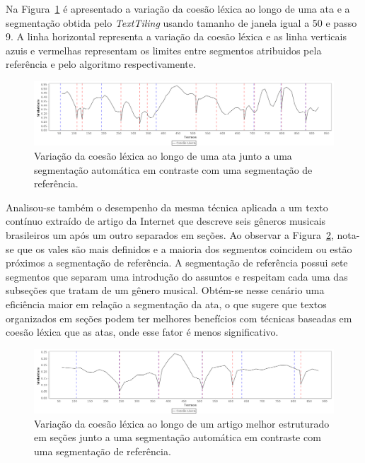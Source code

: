 Na Figura~\ref{fig:coesaolexicaTT} é apresentado a variação da coesão léxica ao longo de uma ata e a segmentação obtida pelo \textit{TextTiling} usando tamanho de janela igual a 50 e passo 9. A linha horizontal representa a variação da coesão léxica e as linha verticais azuis e vermelhas representam os limites entre segmentos atribuidos pela referência e pelo algoritmo respectivamente. 





  \begin{figure}[!h]
	  \centering
	  \includegraphics[width=\textwidth]{conteudo/capitulos/figs/coesaolexicaTT-50-9.png}
	  \caption{Variação da coesão léxica ao longo de uma ata junto a uma segmentação automática em contraste com uma segmentação de referência.}
	  \label{fig:coesaolexicaTT}
  \end{figure}


Analisou-se também o desempenho da mesma técnica aplicada a um texto contínuo extraído de artigo da Internet que descreve seis gêneros musicais brasileiros um após um outro separados em seções. Ao observar a Figura~\ref{fig:coesaolexicaTT-generos-musicais}, nota-se que os vales são mais definidos e a maioria dos segmentos coincidem ou estão próximos a segmentação de referência. A segmentação de referência possui sete segmentos que separam uma introdução do assuntos e respeitam cada uma das subseções que tratam de um gênero musical. Obtém-se nesse cenário uma eficiência maior em relação a segmentação da ata, o que sugere que textos organizados em seções podem ter melhores benefícios com técnicas baseadas em coesão léxica que as atas, onde esse fator é menos significativo.  %



  \begin{figure}[!h]
	  \centering
	  \includegraphics[width=\textwidth]{conteudo/capitulos/figs/generos-musicais-TT-40-20.png}
	  \caption{Variação da coesão léxica ao longo de um artigo melhor estruturado em seções junto a uma segmentação automática em contraste com uma segmentação de referência.}
	  \label{fig:coesaolexicaTT-generos-musicais}
  \end{figure}


